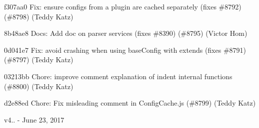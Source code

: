 \begin{DoxyItemize}
\item f307aa0 Fix\+: ensure configs from a plugin are cached separately (fixes \#8792) (\#8798) (Teddy Katz)
\item 8b48ae8 Docs\+: Add doc on parser services (fixes \#8390) (\#8795) (Victor Hom)
\item 0d041e7 Fix\+: avoid crashing when using base\+Config with extends (fixes \#8791) (\#8797) (Teddy Katz)
\item 03213bb Chore\+: improve comment explanation of {\ttfamily indent} internal functions (\#8800) (Teddy Katz)
\item d2e88ed Chore\+: Fix misleading comment in Config\+Cache.\+js (\#8799) (Teddy Katz)
\end{DoxyItemize}

v4.. -\/ June 23, 2017


